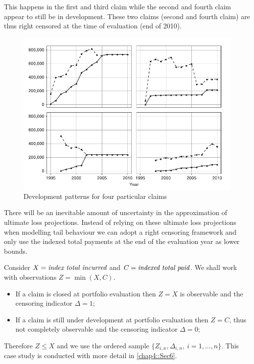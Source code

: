 This happens in the first and third claim while the second and fourth claim appear to still be in development. These two claims (second and fourth claim) are thus right censored at the time of evaluation (end of 2010). 

\begin{figure}[t]
\centering
\includegraphics[width=\textwidth]{./plots/mtpl_claims.pdf}
\caption{Development patterns for four particular claims }

\label{mtpl_fourclaims}
\end{figure}
There will be an inevitable amount of uncertainty in the approximation of ultimate loss projections. Instead of relying on these ultimate loss projections when modelling tail behaviour we can adopt a right censoring framework and only use the indexed total payments at the end of the evaluation year as lower bounds.

Consider $X =\text{\it index total incurred}$ and $C =\text{\it indexed total paid}$. 
We shall work with observations $Z = \min(X,C)$.
\begin{itemize}
\item If a claim is closed at portfolio evaluation then $Z=X$ is observable and the censoring indicator $\Delta = 1$;
\item If a claim is still under development at portfolio evaluation then $Z=C$, thus not completely observable and the censoring indicator $\Delta = 0$;
\end{itemize}Therefore $Z\leq X$ and we use the ordered sample $\{Z_{i,n},\Delta_{i,n},\ i=1,...,n\}$.
This case study is conducted with more detail in \autoref{chap4::Sec6}.

